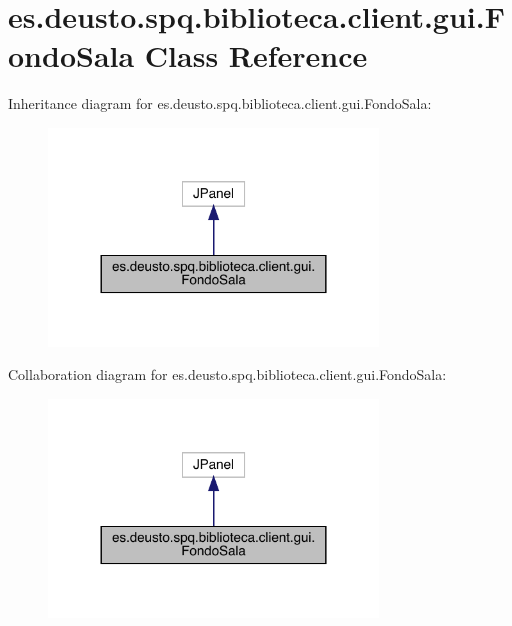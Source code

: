 \hypertarget{classes_1_1deusto_1_1spq_1_1biblioteca_1_1client_1_1gui_1_1_fondo_sala}{}\section{es.\+deusto.\+spq.\+biblioteca.\+client.\+gui.\+Fondo\+Sala Class Reference}
\label{classes_1_1deusto_1_1spq_1_1biblioteca_1_1client_1_1gui_1_1_fondo_sala}


Inheritance diagram for es.\+deusto.\+spq.\+biblioteca.\+client.\+gui.\+Fondo\+Sala\+:
\nopagebreak
\begin{figure}[H]
\begin{center}
\leavevmode
\includegraphics[width=248pt]{classes_1_1deusto_1_1spq_1_1biblioteca_1_1client_1_1gui_1_1_fondo_sala__inherit__graph}
\end{center}
\end{figure}


Collaboration diagram for es.\+deusto.\+spq.\+biblioteca.\+client.\+gui.\+Fondo\+Sala\+:
\nopagebreak
\begin{figure}[H]
\begin{center}
\leavevmode
\includegraphics[width=248pt]{classes_1_1deusto_1_1spq_1_1biblioteca_1_1client_1_1gui_1_1_fondo_sala__coll__graph}
\end{center}
\end{figure}
